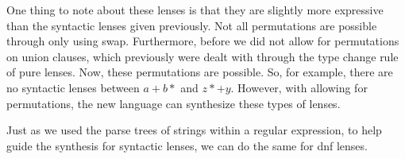 One thing to note about these lenses is that they are slightly more expressive
than the syntactic lenses given previously.
Not all permutations are possible through only using swap.
Furthermore, before we did not allow for permutations on union clauses,
which previously were dealt with through the type change rule of pure lenses.
Now, these permutations are possible.  So, for example, there are no syntactic lenses
between $a+b*$ and $z*+y$.  However, with allowing for permutations, the new
language can synthesize these types of lenses.

Just as we used the parse trees of strings within a regular expression,
to help guide the synthesis for syntactic lenses, we can do the same
for dnf lenses.
